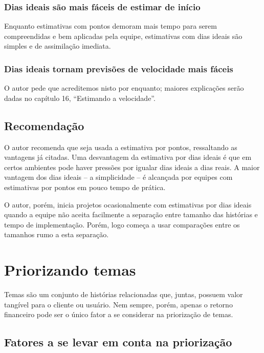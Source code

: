 \documentclass[a4paper,abntfigtabnum,noindentfirst]{abnt}
\begin{document}
\subsection{Dias ideais são mais fáceis de estimar de início}

Enquanto estimativas com pontos demoram mais tempo para serem compreendidas e bem aplicadas pela equipe, estimativas com dias ideais são simples e de assimilação imediata.

\subsection{Dias ideais tornam previsões de velocidade mais fáceis}

O autor pede que acreditemos nisto por enquanto; maiores explicações serão dadas no capítulo 16, ``Estimando a velocidade''.


\section{Recomendação}

O autor recomenda que seja usada a estimativa por pontos, ressaltando as vantagens já citadas. Uma desvantagem da estimativa por dias ideais é que em certos ambientes pode haver pressões por igualar dias ideais a dias reais. A maior vantagem dos dias ideais – a simplicidade – é alcançada por equipes com estimativas por pontos em pouco tempo de prática.

O autor, porém, inicia projetos ocasionalmente com estimativas por dias ideais quando a equipe não aceita facilmente a separação entre tamanho das histórias e tempo de implementação. Porém, logo começa a usar comparações entre os tamanhos rumo a esta separação.



\chapter{Priorizando temas}

Temas são um conjunto de histórias relacionadas que, juntas, possuem valor tangível para o cliente ou usuário. Nem sempre, porém, apenas o retorno financeiro pode ser o único fator a se considerar na priorização de temas.

\section{Fatores a se levar em conta na priorização}
\end{document}
